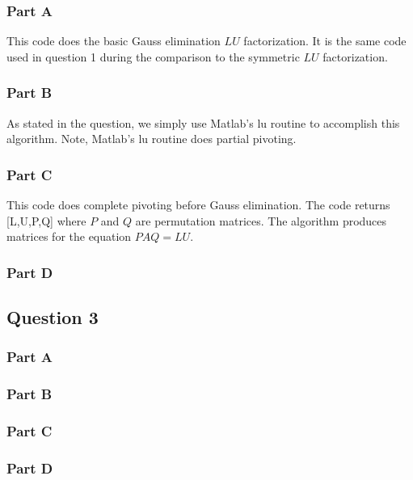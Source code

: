 \subsubsection{Part A}
This code does the basic Gauss elimination \(LU\) factorization.
It is the same code used in question 1 during the comparison to the symmetric \(LU\) factorization.



\subsubsection{Part B}
As stated in the question, we simply use Matlab's lu routine to accomplish this algorithm.
Note, Matlab's lu routine does partial pivoting.

\newpage
\subsubsection{Part C}

This code does complete pivoting before Gauss elimination.
The code returns [L,U,P,Q] where \(P\) and \(Q\) are permutation matrices.
The algorithm produces matrices for the equation \(PAQ = LU\). 



\subsubsection{Part D}


\newpage
\subsection{Question 3}
\subsubsection{Part A}
\subsubsection{Part B}
\subsubsection{Part C}
\subsubsection{Part D}




%


